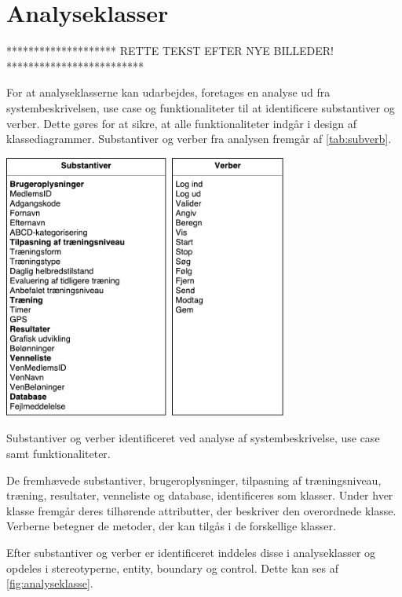 \section{Analyseklasser}
******************** RETTE TEKST EFTER NYE BILLEDER! *************************

For at analyseklasserne kan udarbejdes, foretages en analyse ud fra systembeskrivelsen, use case og funktionaliteter til at identificere substantiver og verber. Dette gøres for at sikre, at alle funktionaliteter indgår i design af klassediagrammer. Substantiver og verber fra analysen fremgår af \autoref{tab:subverb}.

\begin{table}[H]
\centering
\includegraphics[width=0.7\textwidth]{figures/aktivitetsdiagram/substantiveverber}
\caption{Substantiver og verber identificeret ved analyse af systembeskrivelse, use case samt funktionaliteter.}
\label{tab:subverb}
\end{table}

\noindent
De fremhævede substantiver, brugeroplysninger, tilpasning af træningsniveau, træning, resultater, venneliste og database, identificeres som klasser. Under hver klasse fremgår deres tilhørende attributter, der beskriver den overordnede klasse. Verberne betegner de metoder, der kan tilgås i de forskellige klasser. 

Efter substantiver og verber er identificeret inddeles disse i analyseklasser og opdeles i stereotyperne, entity, boundary og control. Dette kan ses af \autoref{fig:analyseklasse}. 

